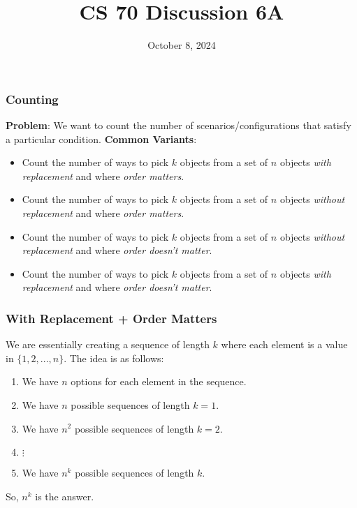 \documentclass{beamer}
\title{CS 70 Discussion 6A}
\date{October 8, 2024}
\begin{document}
\frame{\titlepage}

\begin{frame}
    \frametitle{Counting}
    {\bf Problem}: We want to count the number of scenarios/configurations that satisfy a particular condition.
    {\bf Common Variants}:\begin{itemize}
        \item Count the number of ways to pick $k$ objects from a set of $n$ objects {\it with replacement} and where {\it order matters}.
        \item Count the number of ways to pick $k$ objects from a set of $n$ objects {\it without replacement} and where {\it order matters}.
        \item Count the number of ways to pick $k$ objects from a set of $n$ objects {\it without replacement} and where {\it order doesn't matter}.
        \item Count the number of ways to pick $k$ objects from a set of $n$ objects {\it with replacement} and where {\it order doesn't matter}.
    \end{itemize}
\end{frame}

\begin{frame}
    \frametitle{With Replacement + Order Matters}
    We are essentially creating a sequence of length $k$ where each element is a value in $\{1,2,...,n\}$. The idea is as follows:
    \begin{enumerate}
        \item We have $n$ options for each element in the sequence.
        \item We have $n$ possible sequences of length $k=1$.
        \item We have $n^2$ possible sequences of length $k=2$.
        \item $\vdots$
        \item We have $n^k$ possible sequences of length $k$.
    \end{enumerate}
    So, $\boxed{n^k}$ is the answer.
\end{frame}
\end{document}
